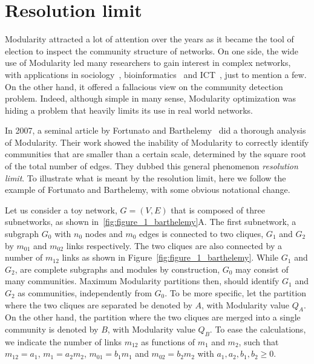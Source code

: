 
\section{Resolution limit}\label{sec:resolutionlimit}
Modularity attracted a lot of attention over the years as it became the tool of election to inspect the community structure of networks.
On one side, the wide use of Modularity led many researchers to gain interest in complex networks, with applications in sociology~\cite{li2008tag}, bioinformatics~\cite{saracc2012topology} and ICT~\cite{java2007we,leskovec2007dynamics}, just to mention a few. On the other hand, it offered a fallacious view on the community detection problem.
Indeed, although simple in many sense, Modularity optimization was hiding a problem that heavily limits its use in real world networks.

In 2007, a seminal article by Fortunato and Barthelemy~\cite{fortunato2007} did a thorough analysis of Modularity.
Their work showed the inability of Modularity to correctly identify communities that are smaller than a certain scale, determined by the square root of the total number of edges. They dubbed this general phenomenon \emph{resolution limit}.
To illustrate what is meant by the resolution limit, here we follow the example of Fortunato and Barthelemy, with some obvious notational change.

Let us consider a toy network, $G=(V, E)$ that is composed of three subnetworks, as shown in~\ref{fig:figure_1_barthelemy}A.
The first subnetwork, a subgraph $G_0$ with $n_0$ nodes and $m_0$ edges is connected to two cliques, $G_1$ and $G_2$ by $m_{01}$ and $m_{02}$ links respectively.
The two cliques are also connected by a number of $m_{12}$ links as shown in Figure~\ref{fig:figure_1_barthelemy}.
While $G_1$ and $G_2$, are complete subgraphs and modules by construction, $G_0$ may consist of many communities.
Maximum Modularity partitions then, should identify $G_1$ and $G_2$ as communities, independently from $G_0$.
To be more specific, let the partition where the two cliques are separated be denoted by $A$, with Modularity value $Q_A$.
On the other hand, the partition where the two cliques are merged into a single community is denoted by $B$, with Modularity value $Q_B$.
To ease the calculations, we indicate the number of links $m_{12}$ as functions of $m_1$ and $m_2$, such that $m_{12}=a_{1}$, $m_1=a_2 m_2$, $m_{01}=b_1 m_1$ and $m_{02}=b_2 m_2$ with $a_1,a_2,b_1,b_2 \geq 0$.

